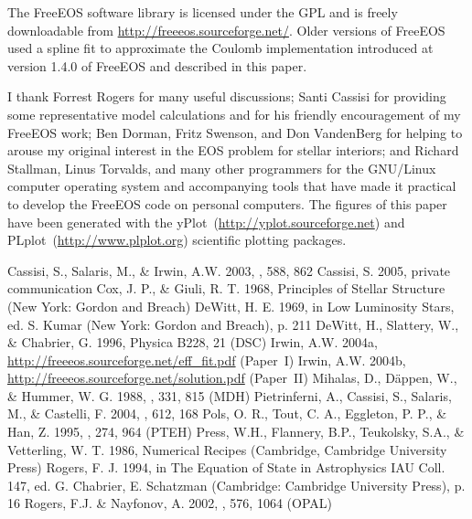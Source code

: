 The FreeEOS software library is licensed under the GPL and is freely
downloadable from \url{http://freeeos.sourceforge.net/}. Older versions of
FreeEOS used a spline fit to approximate the Coulomb implementation
introduced at version 1.4.0 of FreeEOS and described in this paper.

\acknowledgments I thank Forrest Rogers for many useful discussions; Santi
Cassisi for providing some representative model calculations and for his
friendly encouragement of my FreeEOS work; Ben Dorman, Fritz Swenson, and
Don VandenBerg for helping to arouse my original interest in the EOS problem
for stellar interiors; and Richard Stallman, Linus Torvalds, and many other
programmers for the GNU/Linux computer operating system and accompanying
tools that have made it practical to develop the FreeEOS code on personal
computers. The figures of this paper have been generated with the
yPlot~(\url{http://yplot.sourceforge.net}) and
PLplot~(\url{http://www.plplot.org}) scientific plotting packages.

\clearpage
\begin {references}
Cassisi, S., Salaris, M., \& Irwin, A.W. 2003, \apj, 588, 862
Cassisi, S. 2005, private communication
Cox, J. P., \& Giuli, R. T. 1968, Principles of Stellar Structure (New York:
Gordon and Breach)
DeWitt, H. E. 1969, in Low Luminosity Stars, ed. S. Kumar (New York:
Gordon and Breach), p. 211
DeWitt, H., Slattery, W., \& Chabrier, G. 1996, Physica B228, 21 (DSC)
Irwin, A.W. 2004a, \url{http://freeeos.sourceforge.net/eff\_fit.pdf} (Paper~I)
Irwin, A.W. 2004b, \url{http://freeeos.sourceforge.net/solution.pdf} (Paper~II)
Mihalas, D., D\"{a}ppen, W., \& Hummer, W. G. 1988, \apj, 331, 815 (MDH)
Pietrinferni, A., Cassisi, S., Salaris, M., \& Castelli, F. 2004, \apj,
612, 168
Pols, O. R., Tout, C. A., Eggleton, P. P., \& Han, Z. 1995,
\mnras, 274, 964 (PTEH)
Press, W.H., Flannery, B.P., Teukolsky, S.A., \& Vetterling, W. T. 1986,
Numerical Recipes (Cambridge, Cambridge University Press)
Rogers, F. J. 1994, in The Equation of State in Astrophysics IAU Coll. 147,
ed. G. Chabrier, E. Schatzman (Cambridge: Cambridge University Press), p. 16
Rogers, F.J. \& Nayfonov, A. 2002, \apj, 576, 1064 (OPAL)

\end{references}

